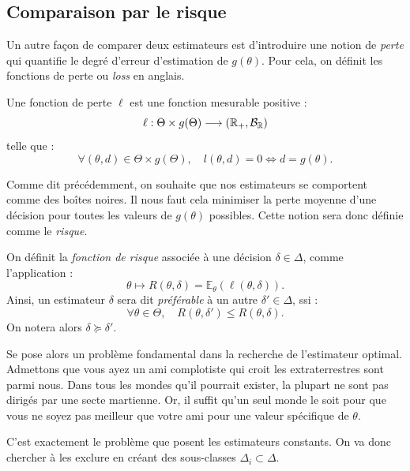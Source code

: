 \subsection{Comparaison par le risque}

Un autre façon de comparer deux estimateurs est d'introduire une notion de 
\emph{perte} qui quantifie le degré d'erreur d'estimation de $ g( \theta)$. 
Pour cela, on définit les fonctions de perte ou \emph{loss} en anglais. 

\begin{definition}
    Une fonction de perte $ \ell$ est une fonction mesurable positive : 
        $$ \ell : \Theta \times g(\Theta) \longrightarrow (\mathbb{R}_+, \mathcal{B}_{\mathbb{R}}) $$ 
    telle que : 
        $$ \boxed{ \forall ( \theta, d) \in \Theta \times g( \Theta), \quad 
            l( \theta, d) = 0 \iff d = g( \theta)    
        }.
        $$
\end{definition}

Comme dit précédemment, on souhaite que nos estimateurs se comportent 
comme des boîtes noires. Il nous faut cela minimiser la perte moyenne 
d'une décision pour toutes les valeurs de $ g(\theta)$ possibles. 
Cette notion sera donc définie comme le \emph{risque}. 

\begin{definition}[Risque]
    On définit la \emph{fonction de risque} associée à une décision $ \delta \in \Delta$, 
    comme l'application : 
        $$ \theta \longmapsto R( \theta, \delta) = \mathbb{E}_\theta( \ell( \theta, \delta)).$$
    Ainsi, un estimateur $ \delta$ sera dit \emph{préférable} à un autre $ \delta' \in \Delta$, ssi : 
        $$ \forall \theta \in \Theta, \quad R( \theta, \delta') \leqslant R( \theta, \delta).$$
    On notera alors $ \delta \succeq \delta'$. 
\end{definition}

\begin{remark}
    Se pose alors un problème fondamental dans la recherche de l'estimateur optimal. 
    Admettons que vous ayez un ami complotiste qui croit les extraterrestres sont 
    parmi nous. Dans tous les mondes qu'il pourrait exister, la plupart ne sont pas 
    dirigés par une secte martienne. Or, il suffit qu'un seul monde le soit pour 
    que vous ne soyez pas meilleur que votre ami pour une valeur spécifique de $ \theta$. 

    C'est exactement le problème que posent les estimateurs constants. On va donc chercher 
    à les exclure en créant des sous-classes $ \Delta_i \subset \Delta$. 
\end{remark}

